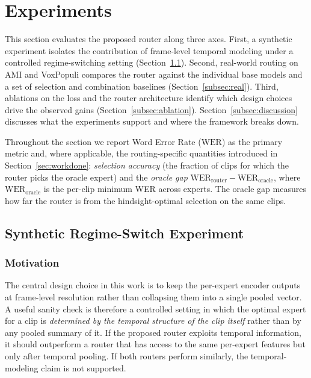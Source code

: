 \documentclass[journal]{IEEEtran}
\begin{document}
\section{Experiments}
\label{sec:experiments}

This section evaluates the proposed router along three axes. First, a
synthetic experiment isolates the contribution of frame-level
temporal modeling under a controlled regime-switching setting
(Section~\ref{subsec:synthetic}). Second, real-world routing on AMI
and VoxPopuli compares the router against the individual base
models and a set of selection and combination baselines
(Section~\ref{subsec:real}). Third, ablations on the loss and the
router architecture identify which design choices drive the observed
gains (Section~\ref{subsec:ablation}). Section~\ref{subsec:discussion}
discusses what the experiments support and where the framework breaks
down.

Throughout the section we report Word Error Rate ($\mathrm{WER}$) as
the primary metric and, where applicable, the routing-specific
quantities introduced in Section~\ref{sec:workdone}: \emph{selection
accuracy} (the fraction of clips for which the router picks the
oracle expert) and the \emph{oracle gap}
$\mathrm{WER}_{\text{router}}-\mathrm{WER}_{\text{oracle}}$, where
$\mathrm{WER}_{\text{oracle}}$ is the per-clip minimum WER across
experts. The oracle gap measures how far the router is from the
hindsight-optimal selection on the same clips.

\subsection{Synthetic Regime-Switch Experiment}
\label{subsec:synthetic}

\subsubsection{Motivation}

The central design choice in this work is to keep the per-expert
encoder outputs at frame-level resolution rather than collapsing them
into a single pooled vector. A useful sanity check is therefore a
controlled setting in which the optimal expert for a clip is
\emph{determined by the temporal structure of the clip itself} rather
than by any pooled summary of it. If the proposed router exploits
temporal information, it should outperform a router that has access
to the same per-expert features but only after temporal pooling. If
both routers perform similarly, the temporal-modeling claim is not
supported.
\end{document}
